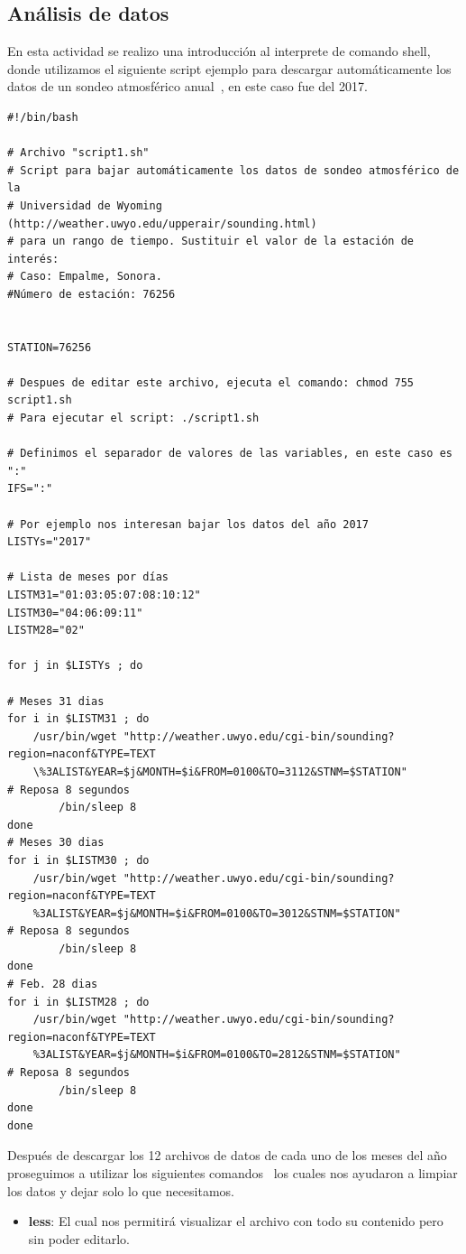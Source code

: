 \documentclass[12pt,letterpaper]{article}
\begin{document}
          \subsection{Análisis de datos}
          En esta actividad se realizo una introducción al interprete de comando shell, donde utilizamos el siguiente script ejemplo para descargar automáticamente los datos de un sondeo atmosférico anual~\cite{University:2017:MISC}, en este caso fue del 2017.
          \begin{verbatim}
#!/bin/bash

# Archivo "script1.sh"
# Script para bajar automáticamente los datos de sondeo atmosférico de la
# Universidad de Wyoming (http://weather.uwyo.edu/upperair/sounding.html)
# para un rango de tiempo. Sustituir el valor de la estación de interés: 
# Caso: Empalme, Sonora.
#Número de estación: 76256


STATION=76256

# Despues de editar este archivo, ejecuta el comando: chmod 755 script1.sh
# Para ejecutar el script: ./script1.sh

# Definimos el separador de valores de las variables, en este caso es ":" 
IFS=":"

# Por ejemplo nos interesan bajar los datos del año 2017
LISTYs="2017"

# Lista de meses por días
LISTM31="01:03:05:07:08:10:12"
LISTM30="04:06:09:11"
LISTM28="02"

for j in $LISTYs ; do

# Meses 31 dias
for i in $LISTM31 ; do
	/usr/bin/wget "http://weather.uwyo.edu/cgi-bin/sounding?region=naconf&TYPE=TEXT
    \%3ALIST&YEAR=$j&MONTH=$i&FROM=0100&TO=3112&STNM=$STATION"
# Reposa 8 segundos
        /bin/sleep 8
done
# Meses 30 dias
for i in $LISTM30 ; do
	/usr/bin/wget "http://weather.uwyo.edu/cgi-bin/sounding?region=naconf&TYPE=TEXT
    %3ALIST&YEAR=$j&MONTH=$i&FROM=0100&TO=3012&STNM=$STATION"
# Reposa 8 segundos
        /bin/sleep 8
done
# Feb. 28 dias
for i in $LISTM28 ; do
	/usr/bin/wget "http://weather.uwyo.edu/cgi-bin/sounding?region=naconf&TYPE=TEXT
    %3ALIST&YEAR=$j&MONTH=$i&FROM=0100&TO=2812&STNM=$STATION"
# Reposa 8 segundos
        /bin/sleep 8
done
done
          \end{verbatim}
          Después de descargar los 12 archivos de datos de cada uno de los meses del año proseguimos a utilizar los siguientes comandos~\cite{Tutorial2:Misc} los cuales nos ayudaron a limpiar los datos y dejar solo lo que necesitamos. \par
            \begin{itemize}
            \item\textbf{less}: El cual nos permitirá visualizar el archivo con todo su contenido pero sin poder editarlo.
 			\end{itemize}
			
\end{document}
